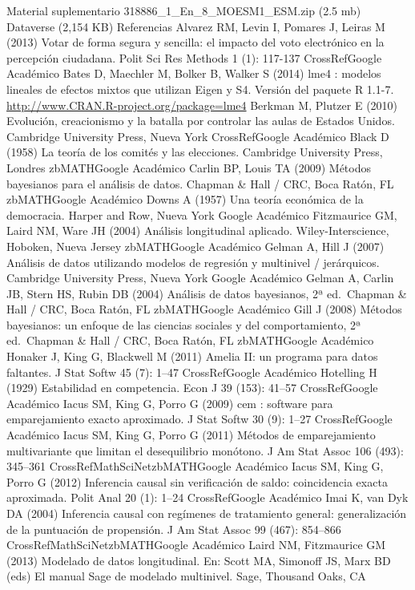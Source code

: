 \documentclass[
]{book}
\begin{document}
Material suplementario
318886\_1\_En\_8\_MOESM1\_ESM.zip (2.5 mb)
Dataverse (2,154 KB)
Referencias
Alvarez RM, Levin I, Pomares J, Leiras M (2013) Votar de forma segura y sencilla: el impacto del voto electrónico en la percepción ciudadana. Polit Sci Res Methods 1 (1): 117-137
CrossRefGoogle Académico
Bates D, Maechler M, Bolker B, Walker S (2014) lme4 : modelos lineales de efectos mixtos que utilizan Eigen y S4. Versión del paquete R 1.1-7. \url{http://www.CRAN.R-project.org/package=lme4}
Berkman M, Plutzer E (2010) Evolución, creacionismo y la batalla por controlar las aulas de Estados Unidos. Cambridge University Press, Nueva York
CrossRefGoogle Académico
Black D (1958) La teoría de los comités y las elecciones. Cambridge University Press, Londres
zbMATHGoogle Académico
Carlin BP, Louis TA (2009) Métodos bayesianos para el análisis de datos. Chapman \& Hall / CRC, Boca Ratón, FL
zbMATHGoogle Académico
Downs A (1957) Una teoría económica de la democracia. Harper and Row, Nueva York
Google Académico
Fitzmaurice GM, Laird NM, Ware JH (2004) Análisis longitudinal aplicado. Wiley-Interscience, Hoboken, Nueva Jersey
zbMATHGoogle Académico
Gelman A, Hill J (2007) Análisis de datos utilizando modelos de regresión y multinivel / jerárquicos. Cambridge University Press, Nueva York
Google Académico
Gelman A, Carlin JB, Stern HS, Rubin DB (2004) Análisis de datos bayesianos, 2ª ed.~Chapman \& Hall / CRC, Boca Ratón, FL
zbMATHGoogle Académico
Gill J (2008) Métodos bayesianos: un enfoque de las ciencias sociales y del comportamiento, 2ª ed.~Chapman \& Hall / CRC, Boca Ratón, FL
zbMATHGoogle Académico
Honaker J, King G, Blackwell M (2011) Amelia II: un programa para datos faltantes. J Stat Softw 45 (7): 1--47
CrossRefGoogle Académico
Hotelling H (1929) Estabilidad en competencia. Econ J 39 (153): 41--57
CrossRefGoogle Académico
Iacus SM, King G, Porro G (2009) cem : software para emparejamiento exacto aproximado. J Stat Softw 30 (9): 1--27
CrossRefGoogle Académico
Iacus SM, King G, Porro G (2011) Métodos de emparejamiento multivariante que limitan el desequilibrio monótono. J Am Stat Assoc 106 (493): 345--361
CrossRefMathSciNetzbMATHGoogle Académico
Iacus SM, King G, Porro G (2012) Inferencia causal sin verificación de saldo: coincidencia exacta aproximada. Polit Anal 20 (1): 1--24
CrossRefGoogle Académico
Imai K, van Dyk DA (2004) Inferencia causal con regímenes de tratamiento general: generalización de la puntuación de propensión. J Am Stat Assoc 99 (467): 854--866
CrossRefMathSciNetzbMATHGoogle Académico
Laird NM, Fitzmaurice GM (2013) Modelado de datos longitudinal. En: Scott MA, Simonoff JS, Marx BD (eds) El manual Sage de modelado multinivel. Sage, Thousand Oaks, CA
\end{document}
